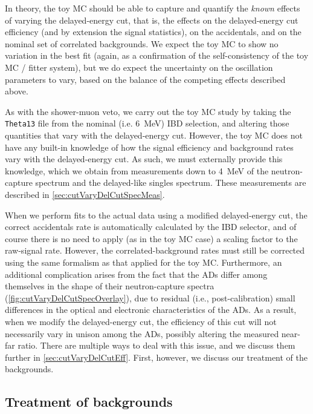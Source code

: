 \documentclass[../thesis.tex]{subfiles}
\begin{document}
In theory, the toy MC should be able to capture and quantify the \emph{known} effects of varying the delayed-energy cut, that is, the effects on the delayed-energy cut efficiency (and by extension the signal statistics), on the accidentals, and on the nominal set of correlated backgrounds. We expect the toy MC to show no variation in the best fit (again, as a confirmation of the self-consistency of the toy MC / fitter system), but we do expect the uncertainty on the oscillation parameters to vary, based on the balance of the competing effects described above.

As with the shower-muon veto, we carry out the toy MC study by taking the \texttt{Theta13} file from the nominal (i.e. 6~MeV) IBD selection, and altering those quantities that vary with the delayed-energy cut. However, the toy MC does not have any built-in knowledge of how the signal efficiency and background rates vary with the delayed-energy cut. As such, we must externally provide this knowledge, which we obtain from measurements down to 4~MeV of the neutron-capture spectrum and the delayed-like singles spectrum. These measurements are described in \autoref{sec:cutVaryDelCutSpecMeas}.

When we perform fits to the actual data using a modified delayed-energy cut, the correct accidentals rate is automatically calculated by the IBD selector, and of course there is no need to apply (as in the toy MC case) a scaling factor to the raw-signal rate. However, the correlated-background rates must still be corrected using the same formalism as that applied for the toy MC\@.  Furthermore, an additional complication arises from the fact that the ADs differ among themselves in the shape of their neutron-capture spectra (\autoref{fig:cutVaryDelCutSpecOverlay}), due to residual (i.e., post-calibration) small differences in the optical and electronic characteristics of the ADs. As a result, when we modify the delayed-energy cut, the efficiency of this cut will not necessarily vary in unison among the ADs, possibly altering the measured near-far ratio. There are multiple ways to deal with this issue, and we discuss them further in \autoref{sec:cutVaryDelCutEff}. First, however, we discuss our treatment of the backgrounds.

\subsection{Treatment of backgrounds}
\label{sec:cutVaryDelayedCutBkgTreatment}
\end{document}
